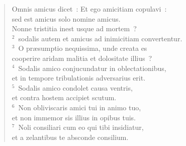 \begin{flushleft}\begin{verse}\vspace{-19pt}\hspace{6pt}Omnis amicus dicet~: Et ego amicitiam copulavi~:\\\hspace{6pt} sed est amicus solo nomine amicus.\\ Nonne tristitia inest usque ad mortem~?\\
${}^{2}$~sodalis autem et amicus ad inimicitiam convertentur.\\
${}^{3}$~O pr\ae sumptio nequissima, unde creata es\\ cooperire aridam malitia et dolositate illius~?\\
${}^{4}$~Sodalis amico conjucundatur in oblectationibus,\\ et in tempore tribulationis adversarius erit.\\
${}^{5}$~Sodalis amico condolet causa ventris,\\ et contra hostem accipiet scutum.\\
${}^{6}$~Non obliviscaris amici tui in animo tuo,\\ et non immemor sis illius in opibus tuis.\\
${}^{7}$~Noli consiliari cum eo qui tibi insidiatur,\\ et a zelantibus te absconde consilium.\end{verse}\end{flushleft}


